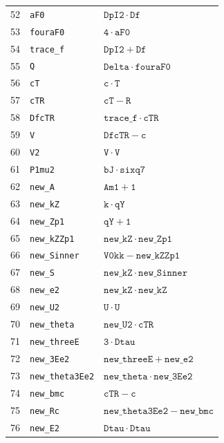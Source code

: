 \begin{longtable}{rll}
52 & \texttt{aF0} & $\mathtt{DpI2} \mathbin{\cdot} \mathtt{Df}$ \\
53 & \texttt{fouraF0} & $\mathtt{4} \mathbin{\cdot} \mathtt{aF0}$ \\
54 & \texttt{trace\_f} & $\mathtt{DpI2} + \mathtt{Df}$ \\
55 & \texttt{Q} & $\mathtt{Delta} \mathbin{\cdot} \mathtt{fouraF0}$ \\
56 & \texttt{cT} & $\mathtt{c} \mathbin{\cdot} \mathtt{T}$ \\
57 & \texttt{cTR} & $\mathtt{cT} - \mathtt{R}$ \\
58 & \texttt{DfcTR} & $\mathtt{trace\_f} \mathbin{\cdot} \mathtt{cTR}$ \\
59 & \texttt{V} & $\mathtt{DfcTR} - \mathtt{c}$ \\
60 & \texttt{V2} & $\mathtt{V} \mathbin{\cdot} \mathtt{V}$ \\
61 & \texttt{P1mu2} & $\mathtt{bJ} \mathbin{\cdot} \mathtt{sixq7}$ \\
62 & \texttt{new\_A} & $\mathtt{Am1} + \mathtt{1}$ \\
63 & \texttt{new\_kZ} & $\mathtt{k} \mathbin{\cdot} \mathtt{qY}$ \\
64 & \texttt{new\_Zp1} & $\mathtt{qY} + \mathtt{1}$ \\
65 & \texttt{new\_kZZp1} & $\mathtt{new\_kZ} \mathbin{\cdot} \mathtt{new\_Zp1}$ \\
66 & \texttt{new\_Sinner} & $\mathtt{V0kk} - \mathtt{new\_kZZp1}$ \\
67 & \texttt{new\_S} & $\mathtt{new\_kZ} \mathbin{\cdot} \mathtt{new\_Sinner}$ \\
68 & \texttt{new\_e2} & $\mathtt{new\_kZ} \mathbin{\cdot} \mathtt{new\_kZ}$ \\
69 & \texttt{new\_U2} & $\mathtt{U} \mathbin{\cdot} \mathtt{U}$ \\
70 & \texttt{new\_theta} & $\mathtt{new\_U2} \mathbin{\cdot} \mathtt{cTR}$ \\
71 & \texttt{new\_threeE} & $\mathtt{3} \mathbin{\cdot} \mathtt{Dtau}$ \\
72 & \texttt{new\_3Ee2} & $\mathtt{new\_threeE} + \mathtt{new\_e2}$ \\
73 & \texttt{new\_theta3Ee2} & $\mathtt{new\_theta} \mathbin{\cdot} \mathtt{new\_3Ee2}$ \\
74 & \texttt{new\_bmc} & $\mathtt{cTR} - \mathtt{c}$ \\
75 & \texttt{new\_Rc} & $\mathtt{new\_theta3Ee2} - \mathtt{new\_bmc}$ \\
76 & \texttt{new\_E2} & $\mathtt{Dtau} \mathbin{\cdot} \mathtt{Dtau}$ \\

\end{longtable}
